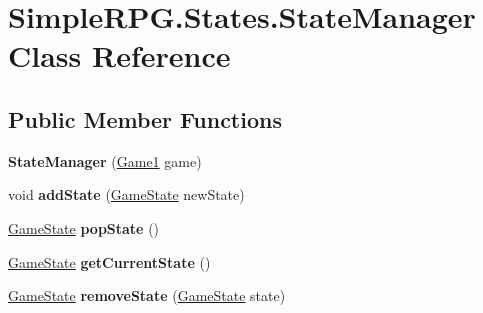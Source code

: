 \hypertarget{class_simple_r_p_g_1_1_states_1_1_state_manager}{\section{Simple\-R\-P\-G.\-States.\-State\-Manager Class Reference}
\label{class_simple_r_p_g_1_1_states_1_1_state_manager}
}
\subsection*{Public Member Functions}
\begin{DoxyCompactItemize}
\item 
\hypertarget{class_simple_r_p_g_1_1_states_1_1_state_manager_a190d4de26a1b06b94cf488a124fd407d}{{\bfseries State\-Manager} (\hyperlink{class_simple_r_p_g_1_1_game1}{Game1} game)}\label{class_simple_r_p_g_1_1_states_1_1_state_manager_a190d4de26a1b06b94cf488a124fd407d}

\item 
\hypertarget{class_simple_r_p_g_1_1_states_1_1_state_manager_ae5698b19b0cf74dec089f2217bbb7b94}{void {\bfseries add\-State} (\hyperlink{class_simple_r_p_g_1_1_states_1_1_game_state}{Game\-State} new\-State)}\label{class_simple_r_p_g_1_1_states_1_1_state_manager_ae5698b19b0cf74dec089f2217bbb7b94}

\item 
\hypertarget{class_simple_r_p_g_1_1_states_1_1_state_manager_a082635e320668aeb0b4e386c00e26b95}{\hyperlink{class_simple_r_p_g_1_1_states_1_1_game_state}{Game\-State} {\bfseries pop\-State} ()}\label{class_simple_r_p_g_1_1_states_1_1_state_manager_a082635e320668aeb0b4e386c00e26b95}

\item 
\hypertarget{class_simple_r_p_g_1_1_states_1_1_state_manager_ab2299a6b8ec00cb7954f2482e61f6d9d}{\hyperlink{class_simple_r_p_g_1_1_states_1_1_game_state}{Game\-State} {\bfseries get\-Current\-State} ()}\label{class_simple_r_p_g_1_1_states_1_1_state_manager_ab2299a6b8ec00cb7954f2482e61f6d9d}

\item 
\hypertarget{class_simple_r_p_g_1_1_states_1_1_state_manager_a8b6fc7246fed3a0b56b863289fa6afd0}{\hyperlink{class_simple_r_p_g_1_1_states_1_1_game_state}{Game\-State} {\bfseries remove\-State} (\hyperlink{class_simple_r_p_g_1_1_states_1_1_game_state}{Game\-State} state)}\label{class_simple_r_p_g_1_1_states_1_1_state_manager_a8b6fc7246fed3a0b56b863289fa6afd0}


\end{DoxyCompactItemize}
